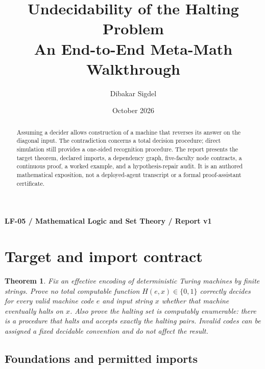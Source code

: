 \documentclass[preprint,12pt,aps,pra,showkeys,amsmath,amssymb,superscriptaddress,floatfix]{revtex4-2}
\newtheorem{theorem}{Theorem}[section]
\theoremstyle{definition}
\theoremstyle{remark}
\begin{document}
\title{Undecidability of the Halting Problem\\[4pt]\large An End-to-End Meta-Math Walkthrough}

\author{Dibakar Sigdel}


\date{October 2026}

\begin{abstract}

Assuming a decider allows construction of a machine that reverses its
answer on the diagonal input. The contradiction concerns a total
decision procedure; direct simulation still provides a one-sided
recognition procedure. The report presents the target theorem, declared
imports, a dependency graph, five-faculty node contracts, a continuous
proof, a worked example, and a hypothesis-repair audit. It is an
authored mathematical exposition, not a deployed-agent transcript or a
formal proof-assistant certificate.

\end{abstract}\maketitle\linespread{1.12}\selectfont

\noindent\textbf{LF-05 / Mathematical Logic and Set Theory / Report v1}

\section{Target and import contract}

\begin{theorem}

Fix an effective encoding of deterministic Turing machines by finite
strings. Prove no total computable function \(H(e,x)\in\{0,1\}\)
correctly decides for every valid machine code \(e\) and input string
\(x\) whether that machine eventually halts on \(x\). Also prove the
halting set is computably enumerable: there is a procedure that halts
and accepts exactly the halting pairs. Invalid codes can be assigned a
fixed decidable convention and do not affect the result.

\end{theorem}

\subsection{Foundations and permitted imports}
\end{document}
